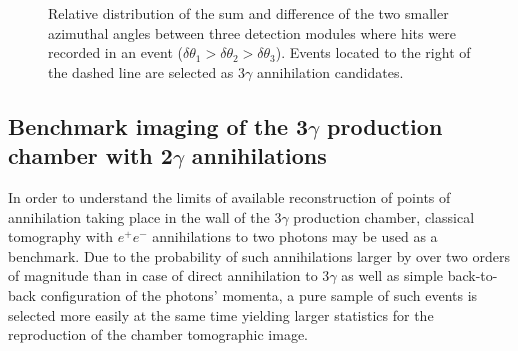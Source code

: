 \begin{figure}[h!]
  \centering
  \caption{Relative distribution of the sum and difference of the two smaller azimuthal angles between three detection modules where hits were recorded in an event ($\delta\theta_1 > \delta\theta_2 > \delta\theta_3$). Events located to the right of the dashed line are selected as 3$\gamma$ annihilation candidates.}\label{fig:jpet_angles}
\end{figure}

\subsection{Benchmark imaging of the 3$\gamma$ production chamber with 2$\gamma$ annihilations}
\label{sec:2g_imaging}
In order to understand the limits of available reconstruction of points of annihilation taking place in the wall of the 3$\gamma$ production chamber, classical tomography with $e^+e^-$ annihilations to two photons may be used as a benchmark. Due to the probability of such annihilations larger by over two orders of magnitude than in case of direct annihilation to 3$\gamma$ as well as simple back-to-back configuration of the photons' momenta, a pure sample of such events is selected more easily at the same time yielding larger statistics for the reproduction of the chamber tomographic image.

